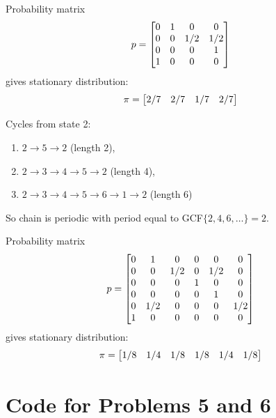 \documentclass{homework}
\begin{document}
\begin{letterenum}
Probability matrix
\begin{equation*}
    p = \begin{bmatrix} 
        0 & 1 & 0 & 0 \\
        0 & 0 & 1/2 & 1/2 \\
        0 & 0 & 0 & 1 \\
        1 & 0 & 0 & 0
     \end{bmatrix}
\end{equation*}
gives stationary distribution:
\begin{equation*}
    \pi = \begin{bmatrix} 2/7 & 2/7 & 1/7 & 2/7 \end{bmatrix}
\end{equation*}

\item Cycles from state 2:
\begin{enumerate}
    \item $2 \to 5 \to 2$ (length 2),
    \item $2 \to 3 \to 4\to 5 \to 2$ (length 4),
    \item $2 \to 3 \to 4 \to 5 \to 6 \to 1 \to 2$ (length 6)
\end{enumerate}
So chain is periodic with period equal to GCF$\{2,4,6,\dots\}= 2$.

Probability matrix
\begin{equation*}
    p = \begin{bmatrix} 
        0 & 1 & 0 & 0 & 0 & 0 \\
        0 & 0 & 1/2 & 0 & 1/2 & 0 \\
        0 & 0 & 0 & 1 & 0 & 0 \\
        0 & 0 & 0 & 0 & 1 & 0 \\
        0 & 1/2 & 0 & 0 & 0 & 1/2 \\
        1 & 0 & 0 & 0 & 0 & 0 \\
     \end{bmatrix}
\end{equation*}
gives stationary distribution:
\begin{equation*}
    \pi = \begin{bmatrix} 1/8 & 1/4 & 1/8 & 1/8 & 1/4 & 1/8 \end{bmatrix}
\end{equation*}
\end{letterenum}

\appendix
\section{Code for Problems 5 and 6}
\end{document}

